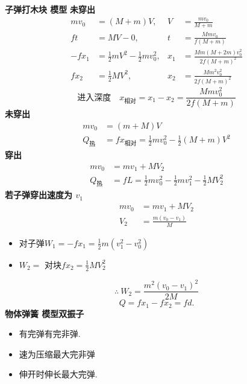 \textbf{子弹打木块 模型}
\textbf{未穿出}
\begin{align*}
mv_0&=(M+m)V, & V&=\frac{mv_0}{M+m}\\
ft&=MV-0, & t&=\frac{Mmv_0}{f(M+m)}\\ %
-fx_1&=\tfrac12 mV^2-\tfrac12 mv_0^2, & x_1&=\frac{Mm(M+2m)v_0^2}{2f(M+m)^2}\\ %
fx_2&=\tfrac12 MV^2, & x_2&=\frac{Mm^2v_0^2}{2f(M+m)^2}
\end{align*}
\[ \text{进入深度}\quad x_{\text{相对}}=x_1-x_2=\frac{Mmv_0^2}{2f(M+m)} \]
\textbf{未穿出}
\begin{align*}
mv_0&=(m+M)V\\
Q_{\text{热}}&=fx_{\text{相对}}=\tfrac12 mv_0^2-\tfrac12(M+m)V^2
\end{align*}
\textbf{穿出}
\begin{align*}
mv_0&=mv_1+MV_2\\
Q_{\text{热}}&=fL=\tfrac12 mv_0^2-\tfrac12 mv_1^2-\tfrac12 MV_2^2
\end{align*}
\textbf{若子弹穿出速度为 $v_1$}
\begin{align*}
mv_0&=mv_1+MV_2\\
V_2&=\frac{m(v_0-v_1)}{M}
\end{align*}
\begin{itemize}
\item 对子弹\quad $W_1=-fx_1=\tfrac12 m(v_1^2-v_0^2)$
\item $W_2=$ 对块\quad $fx_2=\tfrac12 MV_2^2$
\end{itemize}
\[ \therefore\ W_2=\frac{m^2(v_0-v_1)^2}{2M} \]
\[ Q=fx_1-fx_2=fd. \]
\textbf{物体弹簧 模型\quad 双振子}
\begin{itemize}
\item 有完弹\quad 有完非弹.
\item {}速为压缩最大\quad 完非弹 %
\item 伸开时伸长最大\quad 完弹. %
\end{itemize}
